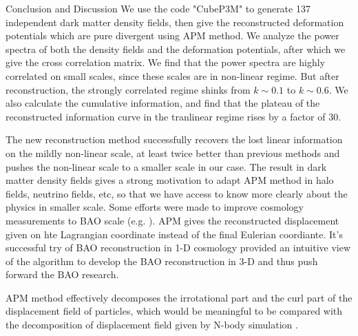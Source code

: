 \begin{section}{Conclusion and Discussion}
 \label{sec:conclusion}
    We use the code "CubeP3M" to generate 137 independent dark matter density fields, then give the reconstructed deformation potentials which are pure divergent using APM method. We analyze the power spectra of both the density fields and the deformation potentials, after which we give the cross correlation matrix. We find that the power spectra are highly correlated on small scales, since these scales are in non-linear regime. But after reconstruction, the strongly correlated regime shinks from $k\sim0.1$ to $k\sim0.6$. We also calculate the cumulative information, and find that the plateau of the reconstructed information curve in the tranlinear regime rises by a factor of 30.  

   The new reconstruction method successfully recovers the lost linear information on the mildly non-linear scale, at least twice better than previous methods \cite{bib:Mark2006,bib:Mark2009,bib:Zhang2011,bib:Yu2012,bib:Mark2014} and pushes the non-linear scale to a smaller scale in our case. The result in dark matter density fields gives a strong motivation to adapt APM method in halo fields, neutrino fields, etc, so that we have access to know more clearly about the physics in smaller scale. Some efforts were made to improve cosmology measurements to BAO scale (e.g. \cite{bib:Daniel2007,bib:Martin2015}). APM gives the reconstructed displacement given on hte Lagrangian coordinate instead of the final Eulerian coordiante. It's successful try of BAO reconstruction in 1-D cosmology \cite{bib:Zhu2016} provided an intuitive view of the algorithm to develop the BAO reconstruction in 3-D and thus push forward the BAO research.

   APM method effectively decomposes the irrotational part and the curl part of the displacement field of particles, which would be meaningful to be compared with the decomposition of displacement field given by N-body simulation \cite{bib:Yu2016}. 
\end{section}
